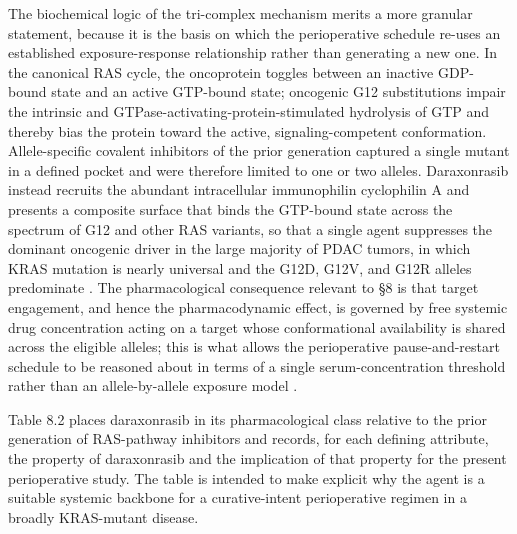 The biochemical logic of the tri-complex mechanism merits a more granular
statement, because it is the basis on which the perioperative schedule re-uses an
established exposure-response relationship rather than generating a new one. In
the canonical RAS cycle, the oncoprotein toggles between an inactive
GDP-bound state and an active GTP-bound state; oncogenic G12 substitutions
impair the intrinsic and GTPase-activating-protein-stimulated hydrolysis of GTP
and thereby bias the protein toward the active, signaling-competent
conformation. Allele-specific covalent inhibitors of the prior generation
captured a single mutant in a defined pocket and were therefore limited to one or
two alleles. Daraxonrasib instead recruits the abundant intracellular
immunophilin cyclophilin A and presents a composite surface that binds the
GTP-bound state across the spectrum of G12 and other RAS variants, so that a
single agent suppresses the dominant oncogenic driver in the large majority of
PDAC tumors, in which KRAS mutation is nearly universal and the G12D, G12V, and
G12R alleles predominate \cite{daraxwhipple,pdac060s2030}. The pharmacological
consequence relevant to \S 8 is that target engagement, and hence the
pharmacodynamic effect, is governed by free systemic drug concentration acting on
a target whose conformational availability is shared across the eligible alleles;
this is what allows the perioperative pause-and-restart schedule to be reasoned
about in terms of a single serum-concentration threshold rather than an
allele-by-allele exposure model \cite{onpremwhippl,qspmetpancre}.

Table 8.2 places daraxonrasib in its pharmacological class relative to the prior
generation of RAS-pathway inhibitors and records, for each defining attribute,
the property of daraxonrasib and the implication of that property for the present
perioperative study. The table is intended to make explicit why the agent is a
suitable systemic backbone for a curative-intent perioperative regimen in a
broadly KRAS-mutant disease.

